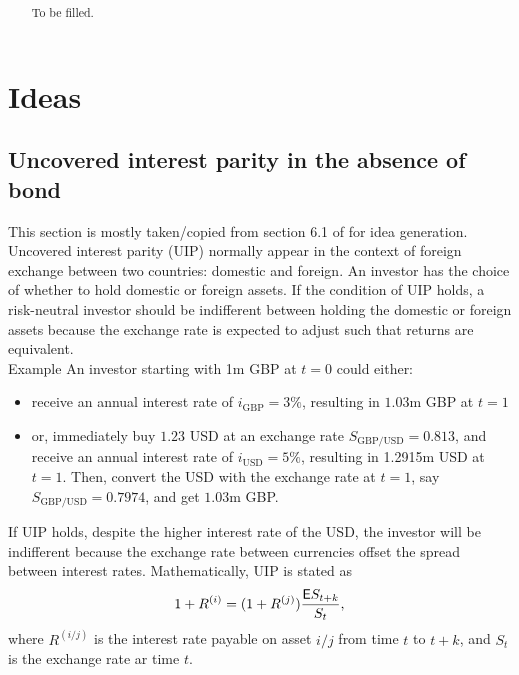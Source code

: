 \documentclass[square]{article} %
\theoremstyle{plain}
\theoremstyle{definition} %
\begin{document}
\setlength{\boxlength}{0.95\textwidth} %
\title{\large{\bf{}}} %
\author{{\normalsize\bf{}}}%
\thispagestyle{empty}
\addtocounter{page}{1}
\maketitle
\begin{abstract}
 To be filled. 
\end{abstract}
\vspace{.5cm}
\def\contentsname{Contents}
\tableofcontents
\vspace{.5cm}
\section{Ideas}
\subsection{Uncovered interest parity in the absence of bond}
This section is mostly taken/copied from section 6.1 of \cite{gudgeon2020defi} for idea generation. 
Uncovered interest parity (UIP) normally appear in the context of foreign exchange between two countries: domestic and foreign. 
An investor has the choice of whether to hold domestic or foreign assets. 
If the condition of UIP holds, a risk-neutral investor should be indifferent between holding the domestic or foreign assets because the exchange rate is expected to adjust such that returns are equivalent. \\

Example
An investor starting with 1m GBP at $t=0$ could either:
\begin{itemize}
  \item receive an annual interest rate of $i_\text{GBP}=3\%$, resulting in $1.03$m GBP at $t=1$
  \item or, immediately buy $1.23$ USD at an exchange rate $S_{\text{GBP}/\text{USD}}=0.813$, and receive an annual interest rate of $i_\text{USD}=5\%$, resulting in 1.2915m USD at $t=1$. 
  Then, convert the USD with the exchange rate at $t=1$, say $S_{\text{GBP}/\text{USD}}=0.7974$, and get $1.03$m GBP.
\end{itemize}

If UIP holds, despite the higher interest rate of the USD, the investor will be indifferent because the exchange rate between currencies offset the spread between interest rates. 
Mathematically, UIP is stated as 
\begin{align*}
1+R^{(i)} = (1+R^{(j)})\frac{\mathbb{\sf E}S_{t+k}}{S_t},
\end{align*}
where $R^{(i/j)}$ is the interest rate payable on asset $i/j$ from time $t$ to $t+k$, and $S_t$ is the exchange rate ar time $t$. \\
\end{document}
